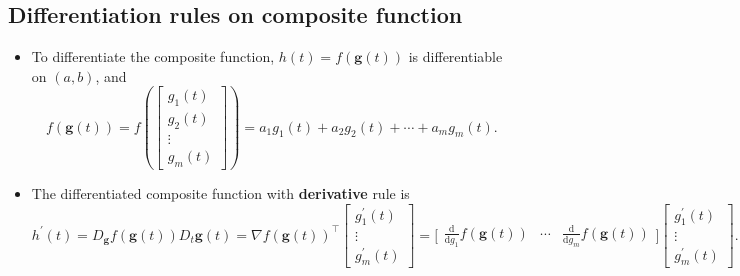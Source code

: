 \documentclass[12pt,thmsa]{article}
\begin{document}
\medskip 

\subsection{Differentiation rules on composite function}
\begin{itemize}
	\item To differentiate the composite function, \( h(t)=f(\boldsymbol{g}(t)) \) is differentiable on \((a, b)\), and
	\[
	f \left( \boldsymbol{g} \left( t \right) 	\right)=
	f \left( \left[
	\begin{array}{c}
		g_{1}( t ) \\
		g_{2}( t ) \\
		\vdots \\
		g_{m}( t )
	\end{array}
	\right]
	\right)
	= a_{1}g_{1}( t ) + a_{2}g_{2}( t ) + \cdots + a_{m}g_{m}( t ).
	\]

	\item The differentiated composite function with \textbf{derivative} rule is 
	\[
	h^{\prime}(t)=D_{\boldsymbol{g}} f(\boldsymbol{g}(t)) D_{t} \boldsymbol{g}(t)
	=\nabla f(\boldsymbol{g}(t))^{\top}
	\left[\begin{array}{c}
		g_{1}^{\prime}(t) \\
		\vdots \\
		g_{m}^{\prime}(t)
	\end{array}  \right] 
	=  \bigg[ \begin{array}{ccc}
		\frac{\mathrm{d}}{\mathrm{d} g_1} f(\boldsymbol{g}(t)) &
		\cdots &
		\frac{\mathrm{d}}{\mathrm{d} g_m} f(\boldsymbol{g}(t))
	\end{array} \bigg] \left[\begin{array}{c}
		g_{1}^{\prime}(t) \\
		\vdots \\
		g_{m}^{\prime}(t)
	\end{array}  \right]  .
	\]
	

\end{itemize}
\end{document}
